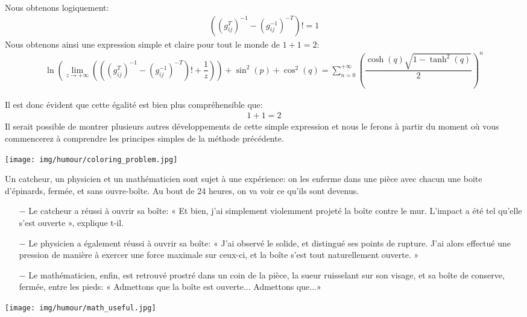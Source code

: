 	Nous obtenons logiquement:
	\begin{gather*}
	\left(\left( g_{ij}^T\right) ^{-1}-\left( g_{ij}^{-1}\right) ^{-T}\right)!=1
	\end{gather*}
	Nous obtenons ainsi une expression simple et claire pour tout le monde de $1+1=2$:
	\begin{gather*}
	\ln\left( \lim_{z \rightarrow +\infty}\left(\left(\left( g_{ij}^T\right) ^{-1}-\left( g_{ij}^{-1}\right) ^{-T}\right)!+\dfrac{1}{z} \right)\right)+\sin^2(p)+\cos^2(q)=\sum_{n=0}^{+\infty} \left( \dfrac{\cosh(q)\sqrt{1-\tanh^2(q)}}{2} \right)^n
	\end{gather*}
	
	Il est donc évident que cette égalité est bien plus compréhensible que:
	\begin{gather*}
	1+1=2
	\end{gather*}
	Il serait possible de montrer plusieurs autres développements de cette simple expression et nous le ferons à partir du moment où vous commencerez à comprendre les principes simples de la méthode précédente.
	
	\begin{center}\underline{\hspace{5 cm}}\end{center}

	\begin{center}
		\texttt{[image: img/humour/coloring\_problem.jpg]}	
	\end{center}

	Un catcheur, un physicien et un mathématicien sont sujet à une expérience: on les enferme dans une pièce avec chacun une boite d'épinards, fermée, et sans ouvre-boîte. Au bout de 24 heures, on va voir ce qu'ils sont devenus. 
	
	\begin{itemize}	 
		\item[$-$] Le catcheur a réussi à ouvrir sa boîte: « Et bien, j'ai simplement violemment projeté la boîte contre le mur. L'impact a été tel qu'elle s'est ouverte », explique t-il. 
	
		\item[$-$] Le physicien a également réussi à ouvrir sa boîte: « J'ai observé le solide, et distingué ses points de rupture. J'ai alors effectué une pression de manière à exercer une force maximale sur ceux-ci, et la boîte s'est tout naturellement ouverte. » 
	
		\item[$-$] Le mathématicien, enfin, est retrouvé prostré dans un coin de la pièce, la sueur ruisselant sur son visage, et sa boîte de conserve, fermée, entre les pieds: « Admettons que la boîte est ouverte... Admettons que...» 
	\end{itemize}
	\begin{center}\underline{\hspace{5 cm}}\end{center}
	\begin{center}
		\texttt{[image: img/humour/math\_useful.jpg]}	
	\end{center}

